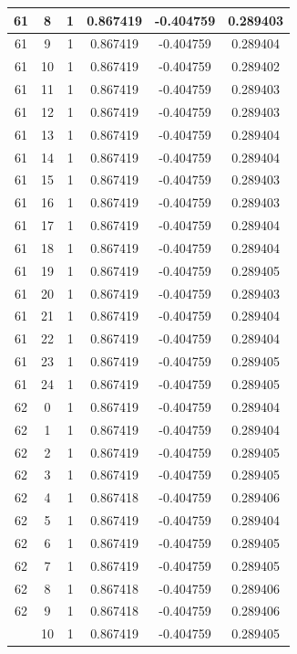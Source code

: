\documentclass[12pt,a4paper]{article}
\numberwithin{equation}{section}
\numberwithin{figure}{section}
\numberwithin{table}{section}
\begin{document}
\begin{longtable}{|c|c|c|c|c|c|}
61 & 8 & 1 & 0.867419 & -0.404759 & 0.289403 \\ \hline
61 & 9 & 1 & 0.867419 & -0.404759 & 0.289404 \\ \hline
61 & 10 & 1 & 0.867419 & -0.404759 & 0.289402 \\ \hline
61 & 11 & 1 & 0.867419 & -0.404759 & 0.289403 \\ \hline
61 & 12 & 1 & 0.867419 & -0.404759 & 0.289403 \\ \hline
61 & 13 & 1 & 0.867419 & -0.404759 & 0.289404 \\ \hline
61 & 14 & 1 & 0.867419 & -0.404759 & 0.289404 \\ \hline
61 & 15 & 1 & 0.867419 & -0.404759 & 0.289403 \\ \hline
61 & 16 & 1 & 0.867419 & -0.404759 & 0.289403 \\ \hline
61 & 17 & 1 & 0.867419 & -0.404759 & 0.289404 \\ \hline
61 & 18 & 1 & 0.867419 & -0.404759 & 0.289404 \\ \hline
61 & 19 & 1 & 0.867419 & -0.404759 & 0.289405 \\ \hline
61 & 20 & 1 & 0.867419 & -0.404759 & 0.289403 \\ \hline
61 & 21 & 1 & 0.867419 & -0.404759 & 0.289404 \\ \hline
61 & 22 & 1 & 0.867419 & -0.404759 & 0.289404 \\ \hline
61 & 23 & 1 & 0.867419 & -0.404759 & 0.289405 \\ \hline
61 & 24 & 1 & 0.867419 & -0.404759 & 0.289405 \\ \hline
62 & 0 & 1 & 0.867419 & -0.404759 & 0.289404 \\ \hline
62 & 1 & 1 & 0.867419 & -0.404759 & 0.289404 \\ \hline
62 & 2 & 1 & 0.867419 & -0.404759 & 0.289405 \\ \hline
62 & 3 & 1 & 0.867419 & -0.404759 & 0.289405 \\ \hline
62 & 4 & 1 & 0.867418 & -0.404759 & 0.289406 \\ \hline
62 & 5 & 1 & 0.867419 & -0.404759 & 0.289404 \\ \hline
62 & 6 & 1 & 0.867419 & -0.404759 & 0.289405 \\ \hline
62 & 7 & 1 & 0.867419 & -0.404759 & 0.289405 \\ \hline
62 & 8 & 1 & 0.867418 & -0.404759 & 0.289406 \\ \hline
62 & 9 & 1 & 0.867418 & -0.404759 & 0.289406 \\ \hline
\pagebreak
62 & 10 & 1 & 0.867419 & -0.404759 & 0.289405 \\ \hline

\end{longtable}
\end{document}
